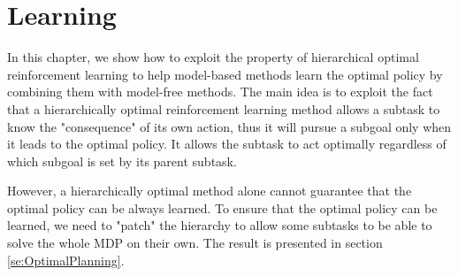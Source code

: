 



\chapter{Learning}

In this chapter, we show how to exploit the property of hierarchical optimal reinforcement learning
to help model-based methods learn the optimal policy by combining them with model-free methods.
The main idea is to exploit the fact that a hierarchically optimal reinforcement learning method allows 
a subtask to know the "consequence" of its own action, thus it will pursue a subgoal
only when it leads to the optimal policy. It allows the subtask to act optimally 
regardless of which subgoal is set by its parent subtask.



However, a hierarchically optimal method alone cannot guarantee that the optimal 
policy can be always learned. To ensure that the optimal policy can be learned, 
we need to "patch" the hierarchy to allow some subtasks to be able to solve
the whole MDP on their own. The result is presented in section \ref{se:OptimalPlanning}.

